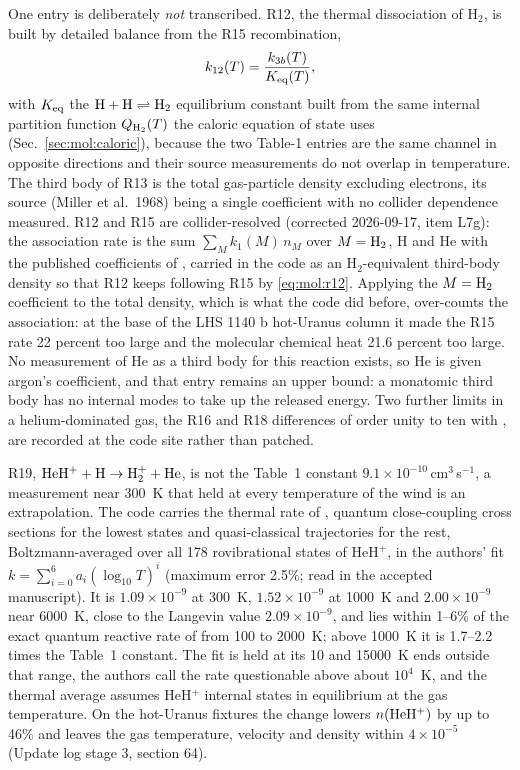 One entry is deliberately \emph{not} transcribed. R12, the thermal
dissociation of H$_2$, is built by detailed balance from the R15
recombination,
\begin{equation}
k_{12}(T) = \frac{k_{3b}(T)}{K_{\rm eq}(T)},
\label{eq:mol:r12}
\end{equation}
with $K_{\rm eq}$ the ${\rm H}+{\rm H}\rightleftharpoons{\rm H_2}$
equilibrium constant built from the same internal partition function
$Q_{\rm H_2}(T)$ the caloric equation of state uses
(Sec.~\ref{sec:mol:caloric}), because the two Table-1 entries are the same
channel in opposite directions and their source measurements do not overlap
in temperature. The third body of R13 is the total gas-particle density
excluding electrons, its source (Miller et al.\ 1968) being a single
coefficient with no collider dependence measured. R12 and R15 are
collider-resolved (corrected 2026-09-17, item L7g): the association rate is
the sum $\sum_M k_1(M)\,n_M$ over $M = {\rm H_2}$, H and He with the
published coefficients of \citet{CohenWestberg1983}, carried in the code as
an H$_2$-equivalent third-body density so that R12 keeps following R15 by
\eqref{eq:mol:r12}.  Applying the $M={\rm H_2}$ coefficient to the total
density, which is what the code did before, over-counts the association: at
the base of the LHS 1140 b hot-Uranus column it made the R15 rate 22 percent
too large and the molecular chemical heat 21.6 percent too large.  No
measurement of He as a third body for this reaction exists, so He is given
argon's coefficient, and that entry remains an upper bound: a monatomic third
body has no internal modes to take up the released energy. Two
further limits in a helium-dominated gas, the R16 and R18 differences
of order unity to ten with \citet{GarciaMunoz2025}, are recorded at the code
site rather than patched.

R19, ${\rm HeH^+}+{\rm H}\to{\rm H_2^+}+{\rm He}$, is not the Table~1
constant $9.1\times10^{-10}$\,cm$^3$\,s$^{-1}$, a measurement near 300~K that
held at every temperature of the wind is an extrapolation. The code carries
the thermal rate of \citet{Esposito2015}, quantum close-coupling cross
sections for the lowest states and quasi-classical trajectories for the rest,
Boltzmann-averaged over all 178 rovibrational states of HeH$^+$, in the
authors' fit $k=\sum_{i=0}^{6}a_i(\log_{10}T)^i$ (maximum error 2.5\%;
read in the accepted manuscript). It is $1.09\times10^{-9}$ at 300~K,
$1.52\times10^{-9}$ at 1000~K and $2.00\times10^{-9}$ near 6000~K, close to
the Langevin value $2.09\times10^{-9}$, and lies within 1--6\% of the exact
quantum reactive rate of \citet{DeFazio2014} from 100 to 2000~K; above 1000~K
it is 1.7--2.2 times the Table~1 constant. The fit is held at its 10 and
15000~K ends outside that range, the authors call the rate questionable above
about $10^4$~K, and the thermal average assumes HeH$^+$ internal states in
equilibrium at the gas temperature. On the hot-Uranus fixtures the change
lowers $n({\rm HeH^+})$ by up to 46\% and leaves the gas temperature,
velocity and density within $4\times10^{-5}$ (Update log stage 3,
section 64).

